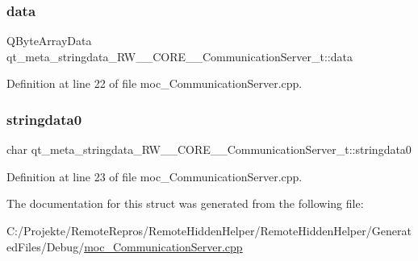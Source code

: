 \subsubsection{\texorpdfstring{data}{data}}
{\footnotesize\ttfamily Q\+Byte\+Array\+Data qt\+\_\+meta\+\_\+stringdata\+\_\+\+R\+W\+\_\+\+\_\+\+C\+O\+R\+E\+\_\+\+\_\+\+Communication\+Server\+\_\+t\+::data}



Definition at line 22 of file moc\+\_\+\+Communication\+Server.\+cpp.

\hypertarget{structqt__meta__stringdata___r_w_____c_o_r_e_____communication_server__t_acf15bb0f0d6b7cf64db912d68f91c534}{}\label{structqt__meta__stringdata___r_w_____c_o_r_e_____communication_server__t_acf15bb0f0d6b7cf64db912d68f91c534} 
\subsubsection{\texorpdfstring{stringdata0}{stringdata0}}
{\footnotesize\ttfamily char qt\+\_\+meta\+\_\+stringdata\+\_\+\+R\+W\+\_\+\+\_\+\+C\+O\+R\+E\+\_\+\+\_\+\+Communication\+Server\+\_\+t\+::stringdata0}



Definition at line 23 of file moc\+\_\+\+Communication\+Server.\+cpp.



The documentation for this struct was generated from the following file\+:\begin{DoxyCompactItemize}
\item 
C\+:/\+Projekte/\+Remote\+Repros/\+Remote\+Hidden\+Helper/\+Remote\+Hidden\+Helper/\+Generated\+Files/\+Debug/\hyperlink{_debug_2moc___communication_server_8cpp}{moc\+\_\+\+Communication\+Server.\+cpp}\end{DoxyCompactItemize}
